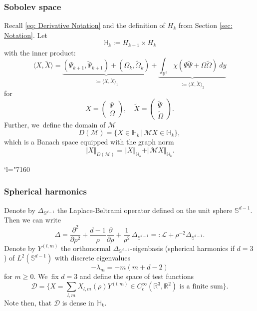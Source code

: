 \documentclass[JEP,XML,SOM,Unicode]{cedram}
\newcommand{\Changel}{\mathcode`l="7160}
\theoremstyle{plain}
\theoremstyle{definition}
\begin{document}
\subsubsection*{Sobolev space}
Recall \eqref{eq: Derivative Notation} and the definition of $H_k$ from Section \ref{sec: Notation}. Let\vspace*{-3pt}
\begin{equation}
\label{eq: Sobolev Space}
\mathbb H_{k}:= H_{k+1}\times H_k
\end{equation}
with the inner product:\vspace*{-3pt}
\begin{equation}
\label{eq: Principal Part}
\langle X,\tilde X\rangle=\underbrace{(\Psi_{k+1},\tilde \Psi_{k+1})+(\Omega_k,\tilde \Omega_k)}_{:=\langle X,\tilde X\rangle_1}+\underbrace{\int_{\mathbb R^3} \chi(\Psi \tilde \Psi +\Omega\tilde \Omega)\ dy}_{:=\langle X,\tilde X\rangle_2}
\end{equation}
for\vspace*{-3pt}
\[
X=\begin{pmatrix} \Psi\\\Omega\end{pmatrix},\quad \tilde X=\begin{pmatrix} \tilde\Psi\\\tilde\Omega\end{pmatrix}.
\]
Further, we~define the domain of $\mathcal M$
\[
D(\mathcal M)=\{X\in\mathbb H_k\,|\, \mathcal M X\in\mathbb H_k\},
\]
which is a Banach space equipped with the graph norm
\[
\Vert X\Vert_{D(\mathcal M)}=\Vert X\Vert_{\mathbb H_k}+\Vert \mathcal MX\Vert_{\mathbb H_k}.
\]

\Changel

\subsubsection*{Spherical harmonics}
Denote by $\Delta_{\mathbb S^{d-1}}$ the Laplace-Beltrami operator defined on the unit sphere $\mathbb S^{d-1}$. Then we can write
\begin{equation}
\label{eq: SH}
\Delta=\frac{\partial^2}{\partial\rho^2}+\frac{d-1}{\rho}\frac{\partial}{\partial\rho}+\frac{1}{\rho^2}\, \Delta_{\mathbb S^{d-1}}=: \mathcal L+\rho^{-2}\Delta_{\mathbb S^{d-1}}.
\end{equation}
Denote by $Y^{(l,m)}$ the orthonormal $\Delta_{\mathbb S^{d-1}}$-eigenbasis (\eg spherical harmonics if $d=3$) of $L^2(\mathbb S^{d-1})$ with discrete eigenvalues
\begin{equation}
\label{eq: Eigenvalue SH}
-\lambda_m=-m(m+d-2)
\end{equation}
for $m\ge0$. We~fix $d=3$ and define the space of test functions
\[
\mathcal D = \textstyle\big\{X=\sum_{l,m} X_{l,m}(\rho)Y^{(l,m)} \in C_c^\infty(\mathbb R^3,\mathbb R^2)\text{ is a finite sum}\big\}.
\]
Note then, that $\mathcal D$ is dense in $\mathbb H_k$.
\end{document}
